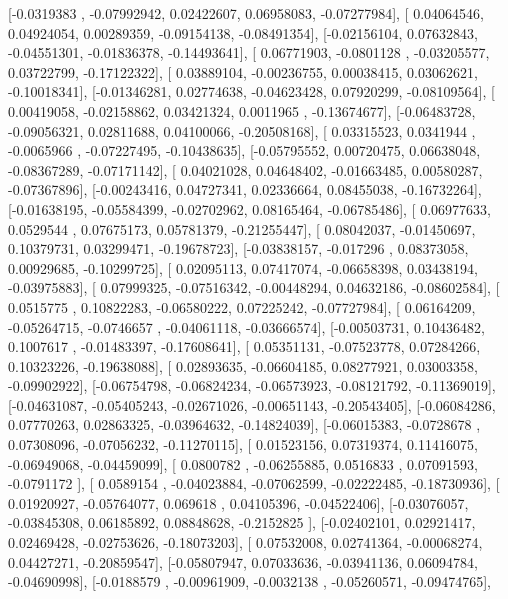 \documentclass{article}
\begin{document}
       [-0.0319383 , -0.07992942,  0.02422607,  0.06958083, -0.07277984],
       [ 0.04064546,  0.04924054,  0.00289359, -0.09154138, -0.08491354],
       [-0.02156104,  0.07632843, -0.04551301, -0.01836378, -0.14493641],
       [ 0.06771903, -0.0801128 , -0.03205577,  0.03722799, -0.17122322],
       [ 0.03889104, -0.00236755,  0.00038415,  0.03062621, -0.10018341],
       [-0.01346281,  0.02774638, -0.04623428,  0.07920299, -0.08109564],
       [ 0.00419058, -0.02158862,  0.03421324,  0.0011965 , -0.13674677],
       [-0.06483728, -0.09056321,  0.02811688,  0.04100066, -0.20508168],
       [ 0.03315523,  0.0341944 , -0.0065966 , -0.07227495, -0.10438635],
       [-0.05795552,  0.00720475,  0.06638048, -0.08367289, -0.07171142],
       [ 0.04021028,  0.04648402, -0.01663485,  0.00580287, -0.07367896],
       [-0.00243416,  0.04727341,  0.02336664,  0.08455038, -0.16732264],
       [-0.01638195, -0.05584399, -0.02702962,  0.08165464, -0.06785486],
       [ 0.06977633,  0.0529544 ,  0.07675173,  0.05781379, -0.21255447],
       [ 0.08042037, -0.01450697,  0.10379731,  0.03299471, -0.19678723],
       [-0.03838157, -0.017296  ,  0.08373058,  0.00929685, -0.10299725],
       [ 0.02095113,  0.07417074, -0.06658398,  0.03438194, -0.03975883],
       [ 0.07999325, -0.07516342, -0.00448294,  0.04632186, -0.08602584],
       [ 0.0515775 ,  0.10822283, -0.06580222,  0.07225242, -0.07727984],
       [ 0.06164209, -0.05264715, -0.0746657 , -0.04061118, -0.03666574],
       [-0.00503731,  0.10436482,  0.1007617 , -0.01483397, -0.17608641],
       [ 0.05351131, -0.07523778,  0.07284266,  0.10323226, -0.19638088],
       [ 0.02893635, -0.06604185,  0.08277921,  0.03003358, -0.09902922],
       [-0.06754798, -0.06824234, -0.06573923, -0.08121792, -0.11369019],
       [-0.04631087, -0.05405243, -0.02671026, -0.00651143, -0.20543405],
       [-0.06084286,  0.07770263,  0.02863325, -0.03964632, -0.14824039],
       [-0.06015383, -0.0728678 ,  0.07308096, -0.07056232, -0.11270115],
       [ 0.01523156,  0.07319374,  0.11416075, -0.06949068, -0.04459099],
       [ 0.0800782 , -0.06255885,  0.0516833 ,  0.07091593, -0.0791172 ],
       [ 0.0589154 , -0.04023884, -0.07062599, -0.02222485, -0.18730936],
       [ 0.01920927, -0.05764077,  0.069618  ,  0.04105396, -0.04522406],
       [-0.03076057, -0.03845308,  0.06185892,  0.08848628, -0.2152825 ],
       [-0.02402101,  0.02921417,  0.02469428, -0.02753626, -0.18073203],
       [ 0.07532008,  0.02741364, -0.00068274,  0.04427271, -0.20859547],
       [-0.05807947,  0.07033636, -0.03941136,  0.06094784, -0.04690998],
       [-0.0188579 , -0.00961909, -0.0032138 , -0.05260571, -0.09474765],
\end{document}
